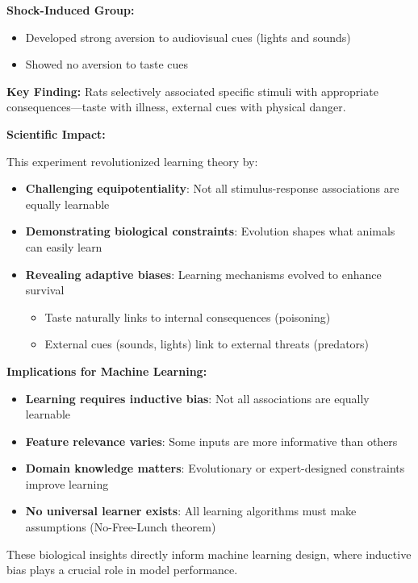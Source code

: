 \textbf{Shock-Induced Group:}

\begin{itemize}
\item Developed strong aversion to audiovisual cues (lights and sounds)  
\item Showed no aversion to taste cues
\end{itemize}

\textbf{Key Finding:} Rats selectively associated specific stimuli with appropriate consequences—taste with illness, external cues with physical danger.

\textbf{Scientific Impact:}

This experiment revolutionized learning theory by:

\begin{itemize}
\item \textbf{Challenging equipotentiality}: Not all stimulus-response associations are equally learnable
\item \textbf{Demonstrating biological constraints}: Evolution shapes what animals can easily learn
\item \textbf{Revealing adaptive biases}: Learning mechanisms evolved to enhance survival
\begin{itemize}
\item Taste naturally links to internal consequences (poisoning)
\item External cues (sounds, lights) link to external threats (predators)
\end{itemize}
\end{itemize}

\textbf{Implications for Machine Learning:}

\begin{itemize}
\item \textbf{Learning requires inductive bias}: Not all associations are equally learnable
\item \textbf{Feature relevance varies}: Some inputs are more informative than others  
\item \textbf{Domain knowledge matters}: Evolutionary or expert-designed constraints improve learning
\item \textbf{No universal learner exists}: All learning algorithms must make assumptions (No-Free-Lunch theorem)
\end{itemize}

These biological insights directly inform machine learning design, where inductive bias plays a crucial role in model performance.

